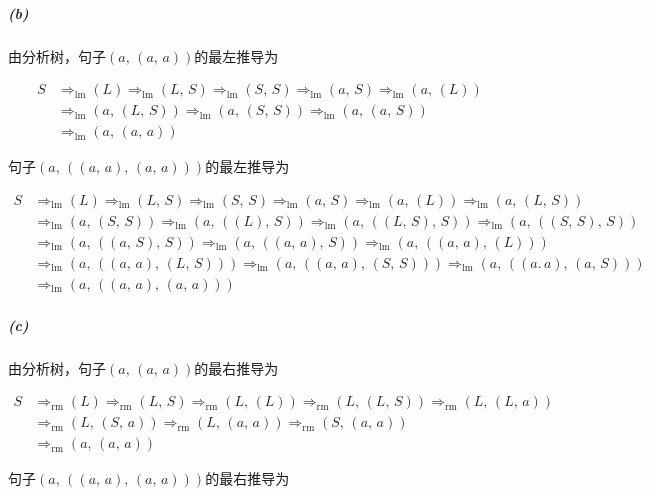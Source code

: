 \documentclass{article}
\begin{document}
\subparagraph{(b)}
由分析树，句子$(a,\,(a,\,a))$的最左推导为

\begin{align*}
    S &\Rightarrow_{\text{lm}} (L) \Rightarrow_{\text{lm}} (L,\,S) \Rightarrow_{\text{lm}} (S,\,S) \Rightarrow_{\text{lm}} (a,\,S) \Rightarrow_{\text{lm}} (a,\,(L)) \\
    &\Rightarrow_{\text{lm}} (a,\,(L,\,S))
    \Rightarrow_{\text{lm}} (a,\,(S,\,S)) \Rightarrow_{\text{lm}} (a,\,(a,\,S)) \\
    &\Rightarrow_{\text{lm}} (a,\,(a,\,a))
\end{align*}

句子$(a,\,((a,\,a),\,(a,\,a)))$的最左推导为

\begin{align*}
    S &\Rightarrow_{\text{lm}} (L) \Rightarrow_{\text{lm}} (L,\,S) \Rightarrow_{\text{lm}} (S,\,S) \Rightarrow_{\text{lm}} (a,\,S) \Rightarrow_{\text{lm}} (a,\,(L)) \Rightarrow_{\text{lm}} (a,\,(L,\,S)) \\
    &\Rightarrow_{\text{lm}} (a,\,(S,\,S)) \Rightarrow_{\text{lm}} (a,\,((L),\,S)) \Rightarrow_{\text{lm}} (a,\,((L,\,S),\,S)) \Rightarrow_{\text{lm}} (a,\,((S,\,S),\,S)) \\
    &\Rightarrow_{\text{lm}} (a,\,((a,\,S),\,S))
    \Rightarrow_{\text{lm}} (a,\,((a,\,a),\,S)) \Rightarrow_{\text{lm}} (a,\,((a,\,a),\,(L))) \\
    &\Rightarrow_{\text{lm}} (a,\,((a,\,a),\,(L,\,S)))
    \Rightarrow_{\text{lm}} (a,\,((a,\,a),\,(S,\,S))) \Rightarrow_{\text{lm}} (a,\,((a.\,a),\,(a,\,S))) \\
    &\Rightarrow_{\text{lm}} (a,\,((a,\,a),\,(a,\,a)))
\end{align*}

\subparagraph{(c)}
由分析树，句子$(a,\,(a,\,a))$的最右推导为

\begin{align*}
    S &\Rightarrow_{\text{rm}} (L) \Rightarrow_{\text{rm}} (L,\,S) \Rightarrow_{\text{rm}} (L,\,(L)) \Rightarrow_{\text{rm}} (L,\,(L,\,S)) \Rightarrow_{\text{rm}} (L,\,(L,\,a)) \\
    &\Rightarrow_{\text{rm}} (L,\,(S,\,a))
    \Rightarrow_{\text{rm}} (L,\,(a,\,a)) \Rightarrow_{\text{rm}} (S,\,(a,\,a)) \\
    &\Rightarrow_{\text{rm}} (a,\,(a,\,a))
\end{align*}

句子$(a,\,((a,\,a),\,(a,\,a)))$的最右推导为
\end{document}

